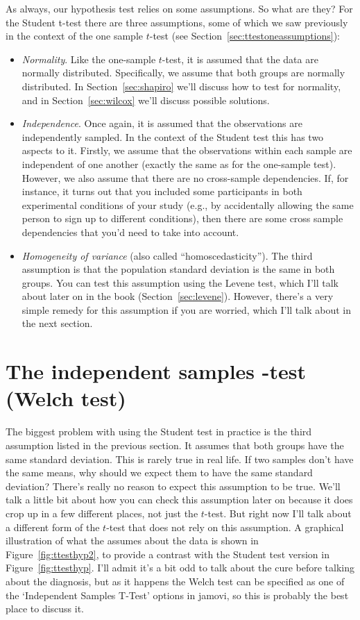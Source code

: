 As always, our hypothesis test relies on some assumptions. So what are they? For the Student t-test there are three assumptions, some of which we saw previously in the context of the one sample $t$-test (see Section~\ref{sec:ttestoneassumptions}):
\begin{itemize}
\item {\it Normality}. Like the one-sample $t$-test, it is assumed that the data are normally distributed. Specifically, we assume that both groups are normally distributed. In Section~\ref{sec:shapiro} we'll discuss how to test for normality, and in Section~\ref{sec:wilcox} we'll discuss possible solutions.
\item {\it Independence}. Once again, it is assumed that the observations are independently sampled. In the context of the Student test this has two aspects to it. Firstly, we assume that the observations within each sample are independent of one another (exactly the same as for the one-sample test). However, we also assume that there are no cross-sample dependencies. If, for instance, it turns out that you included some participants in both experimental conditions of your study (e.g., by accidentally allowing the same person to sign up to different conditions), then there are some cross sample dependencies that you'd need to take into account.
\item {\it Homogeneity of variance} (also called ``homoscedasticity''). The third assumption is that the population standard deviation is the same in both groups. You can test this assumption using the Levene test, which I'll talk about later on in the book (Section~\ref{sec:levene}). However, there's a very simple remedy for this assumption if you are worried, which I'll talk about in the next section.
\end{itemize}


\section{The independent samples \texorpdfstring{}{}-test (Welch test)~\label{sec:welchttest}}

The biggest problem with using the Student test in practice is the third assumption listed in the previous section. It assumes that both groups have the same standard deviation. This is rarely true in real life. If two samples don't have the same means, why should we expect them to have the same standard deviation? There's really no reason to expect this assumption to be true. We'll talk a little bit about how you can check this assumption later on because it does crop up in a few different places, not just the $t$-test. But right now I'll talk about a different form of the $t$-test \parencite{Welch1947} that does not rely on this assumption. A graphical illustration of what the  assumes about the data is shown in Figure~\ref{fig:ttesthyp2}, to provide a contrast with the Student test version in Figure~\ref{fig:ttesthyp}. I'll admit it's a bit odd to talk about the cure before talking about the diagnosis, but as it happens the Welch test can be specified as one of the `Independent Samples T-Test' options in jamovi, so this is probably the best place to discuss it. 


